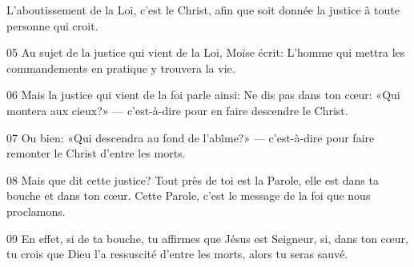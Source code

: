 L’aboutissement de la Loi, c’est le Christ, afin que soit donnée la justice à toute personne qui croit.

05 Au sujet de la justice qui vient de la Loi, Moïse écrit: L’homme qui mettra les commandements en pratique y trouvera la vie.

06 Mais la justice qui vient de la foi parle ainsi: Ne dis pas dans ton cœur: «Qui montera aux cieux?» --- c’est-à-dire pour en faire descendre le Christ.

07 Ou bien: «Qui descendra au fond de l’abîme?» --- c’est-à-dire pour faire remonter le Christ d’entre les morts.

08 Mais que dit cette justice? Tout près de toi est la Parole, elle est dans ta bouche et dans ton cœur. Cette Parole, c’est le message de la foi que nous proclamons.

09 En effet, si de ta bouche, tu affirmes que Jésus est Seigneur, si, dans ton cœur, tu crois que Dieu l’a ressuscité d’entre les morts, alors tu seras sauvé.
